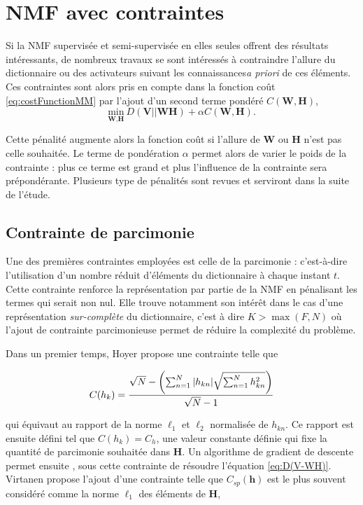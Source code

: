 \section{NMF avec contraintes}\label{part:NMF_contrainte}
Si la NMF supervisée et semi-supervisée en elles seules offrent des résultats intéressants, de nombreux travaux se sont intéressés à contraindre l'allure du dictionnaire ou des activateurs suivant les connaissances\textit{a priori} de ces éléments. Ces contraintes sont alors pris en compte dans la fonction coût \ref{eq:costFunctionMM} par l'ajout d'un second terme pondéré $C(\mathbf{W},\mathbf{H})$, 
\begin{equation}
\underset{\textbf{W},\textbf{H}}{\text{min}}~D\left(\textbf{V} \vert\vert \textbf{WH}\right) + \alpha C(\mathbf{W},\mathbf{H}).
\end{equation}

Cette pénalité augmente alors la fonction coût si l'allure de $\mathbf{W}$ ou $\mathbf{H}$ n'est pas celle souhaitée. Le terme de pondération $\alpha$ permet alors de varier le poids de la contrainte : plus ce terme est grand et plus l'influence de la contrainte sera prépondérante. Plusieurs type de pénalités sont revues et serviront dans la suite de l'étude. 

\subsection{Contrainte de parcimonie}
Une des premières contraintes employées est celle de la parcimonie \cite{hoyer_non-negative_2004} \cite{le2015sparse} : c'est-à-dire l'utilisation d'un nombre réduit d'éléments du dictionnaire à chaque instant $t$. Cette contrainte renforce la représentation par partie de la NMF en pénalisant les termes qui serait non nul. Elle trouve notamment son intérêt dans le cas d'une représentation \textit{sur-complète} du dictionnaire, c'est à dire $K > \max(F,N)$ où l'ajout de contrainte parcimonieuse permet de réduire la complexité du problème. 

Dans un premier temps, Hoyer \cite{hoyer_non-negative_2004} propose une contrainte telle que 

\begin{equation}
C(h_k) = \frac{\sqrt{N}-\left( \sum_{n=1}^N \vert h_{kn} \vert \/ \sqrt{\sum_{n = 1}^N h_{kn}^2} \right)}{\sqrt{N}-1}
\end{equation}

qui équivaut au rapport de la norme $\ell_1$ et $\ell_2$ normalisée de $h_{kn}$. Ce rapport est ensuite défini tel que $C(h_k) = C_h$, une valeur constante définie qui fixe la quantité de parcimonie souhaitée dans $\mathbf{H}$. Un algorithme de gradient de descente permet ensuite , sous cette contrainte de résoudre l'équation \ref{eq:D(V-WH)}. Virtanen \cite{virtanen_monaural_2007} propose l'ajout d'une contrainte telle que $C_{sp}(\mathbf{h})$ est le plus souvent considéré comme la norme $\ell_1$ des éléments de $\mathbf{H}$,

